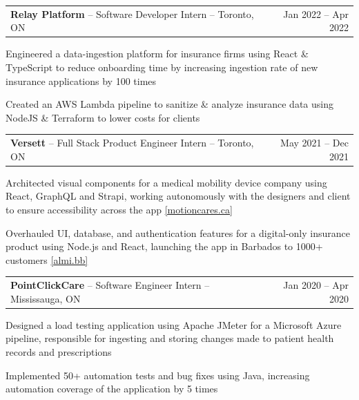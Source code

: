 \documentclass[letterpaper,10pt]{article}
\makeatletter
\newcommand{\entry}[2]{%
  \noindent\begin{tabularx}{\linewidth}{@{}X r@{}}
    #1 & #2 \\
  \end{tabularx}%
}
\makeatother
\begin{document}
\entry{\textbf{Relay Platform} -- Software Developer Intern -- Toronto, ON}{Jan 2022 -- Apr 2022}
\begin{tight}
  \item Engineered a data-ingestion platform for insurance firms using React \& TypeScript to reduce onboarding time by increasing ingestion rate of new insurance applications by 100 times
  \item Created an AWS Lambda pipeline to sanitize \& analyze insurance data using NodeJS \& Terraform to lower costs for clients
\end{tight}

\entry{\textbf{Versett} -- Full Stack Product Engineer Intern -- Toronto, ON}{May 2021 -- Dec 2021}
\begin{tight}
  \item Architected visual components for a medical mobility device company using React, GraphQL and Strapi, working autonomously with the designers and client to ensure accessibility across the app \href{https://motioncares.ca}{[motioncares.ca]}
  \item Overhauled UI, database, and authentication features for a digital-only insurance product using Node.js and React, launching the app in Barbados to 1000+ customers \href{https://almi.bb}{[almi.bb]}
\end{tight}

\entry{\textbf{PointClickCare} -- Software Engineer Intern -- Mississauga, ON}{Jan 2020 -- Apr 2020}
\begin{tight}
  \item Designed a load testing application using Apache JMeter for a Microsoft Azure pipeline, responsible for ingesting and storing changes made to patient health records and prescriptions
  \item Implemented 50+ automation tests and bug fixes using Java, increasing automation coverage of the application by 5 times
\end{tight}

\end{document}
